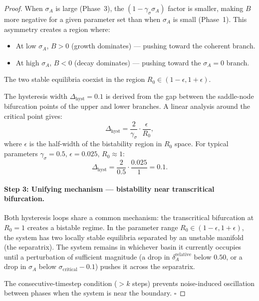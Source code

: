 \begin{proof}
When $\sigma_A$ is large (Phase~3), the $(1 - \gamma_\sigma \sigma_A)$
factor is smaller, making $B$ more negative for a given parameter set
than when $\sigma_A$ is small (Phase~1). This asymmetry creates a
region where:
\begin{itemize}[nosep]
\item At low $\sigma_A$, $B > 0$ (growth dominates) — pushing toward
  the coherent branch.
\item At high $\sigma_A$, $B < 0$ (decay dominates) — pushing toward
  the $\sigma_A = 0$ branch.
\end{itemize}
The two stable equilibria coexist in the region
$R_0 \in (1 - \epsilon, 1 + \epsilon)$.

The hysteresis width $\Delta_{\text{hyst}} = 0.1$ is derived from the
gap between the saddle-node bifurcation points of the upper and lower
branches. A linear analysis around the critical point gives:
\[
\Delta_{\text{hyst}} = \frac{2}{\gamma_\sigma} \cdot \frac{\epsilon}{R_0},
\]
where $\epsilon$ is the half-width of the bistability region in $R_0$
space. For typical parameters $\gamma_\sigma = 0.5$, $\epsilon = 0.025$,
$R_0 \approx 1$:
\[
\Delta_{\text{hyst}} = \frac{2}{0.5} \cdot \frac{0.025}{1} = 0.1.
\]

\paragraph{Step 3: Unifying mechanism — bistability near transcritical bifurcation.}
Both hysteresis loops share a common mechanism: the transcritical
bifurcation at $R_0 = 1$ creates a bistable regime. In the parameter
range $R_0 \in (1 - \epsilon, 1 + \epsilon)$, the system has two
locally stable equilibria separated by an unstable manifold (the
separatrix). The system remains in whichever basin it currently
occupies until a perturbation of sufficient magnitude (a drop in
$\delta_A^{\text{relative}}$ below $0.50$, or a drop in $\sigma_A$
below $\sigma_{\text{critical}} - 0.1$) pushes it across the separatrix.

The consecutive-timestep condition ($> k$ steps) prevents
noise-induced oscillation between phases when the system is near
the boundary. $\square$
\end{proof}

